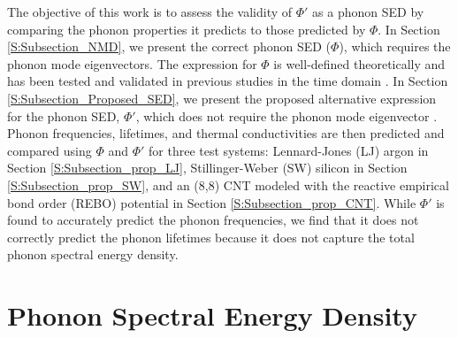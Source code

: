 The objective of this work is to assess the validity of $\Phi'$ as a 
phonon SED by comparing the phonon 
properties it predicts to those predicted by $\Phi$. In Section 
\ref{S:Subsection_NMD}, we present the 
correct phonon SED ($\Phi$), which requires the phonon mode eigenvectors. 
The expression for $\Phi$ is 
well-defined theoretically and has been tested and validated in previous 
studies in the time domain 
\cite{ladd_lattice_1986,turney_predicting_2009}. 
In Section \ref{S:Subsection_Proposed_SED}, 
we present the proposed 
alternative expression for the phonon SED, $\Phi'$, which does not require 
the phonon mode eigenvector 
\cite{thomas_predicting_2010}. Phonon frequencies, lifetimes, and thermal 
conductivities are then predicted and 
compared using $\Phi$ and $\Phi'$ for three test systems: Lennard-Jones 
(LJ) argon \cite{ashcroft_solid_1976} 
in Section \ref{S:Subsection_prop_LJ}, Stillinger-Weber (SW) silicon 
\cite{stillinger_computer_1985} in Section 
\ref{S:Subsection_prop_SW}, and an (8,8) CNT modeled with the reactive 
empirical bond order (REBO) potential 
\cite{brenner_second_2002} in Section \ref{S:Subsection_prop_CNT}. 
While $\Phi'$ 
is found to accurately predict the 
phonon frequencies, we find that it does not correctly predict the phonon 
lifetimes because it does not 
capture the total phonon spectral energy density.
\section{\label{S:Section_NMD}Phonon Spectral Energy Density}
